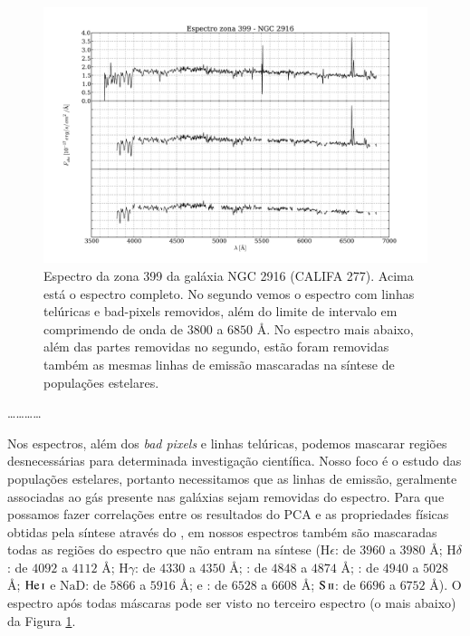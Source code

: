 \begin{figure}
    \includegraphics[width=1.0\textwidth]{figuras/K0277-constant_inital_mask-399.pdf}
    \caption[Exemplo de máscaras em um espectro do cubo de dados.]
    {Espectro da zona 399 da galáxia NGC 2916 (CALIFA 277). Acima está o espectro completo. No segundo vemos o espectro
    com linhas telúricas e bad-pixels removidos, além do limite de intervalo em comprimendo de onda de $3800$ a $6850$
    \AA. No espectro mais abaixo, além das partes removidas no segundo, estão foram removidas também as mesmas linhas de
    emissão mascaradas na síntese de populações estelares.}
    \label{fig:cap4:checkmask}
\end{figure}

\ldots \dots \ldots \ldots

Nos espectros, além dos {\em bad pixels} e linhas telúricas, podemos mascarar regiões desnecessárias para determinada
investigação científica. Nosso foco é o estudo das populações estelares, portanto necessitamos que as linhas de emissão,
geralmente associadas ao gás presente nas galáxias \fixme sejam removidas do espectro. Para que possamos fazer
correlações entre os resultados do PCA e as propriedades físicas obtidas pela síntese através do \starlight, em nossos
espectros também são mascaradas todas as regiões do espectro que não entram na síntese ($\mathrm{H}\epsilon$: de $3960$
a $3980$ \AA; $\mathrm{H}\delta$: de $4092$ a $4112$ \AA; $\mathrm{H}\gamma$: de $4330$ a $4350$ \AA; \Hbeta: de $4848$
a $4874$ \AA; \oIII: de $4940$ a $5028$ \AA; $\mathrm{He\,\textsc{i}}$ e $\mathrm{NaD}$: de $5866$ a $5916$ \AA; \Halpha
e \nII: de $6528$ a $6608$ \AA; $\mathrm{S\,\textsc{ii}}$: de $6696$ a $6752$ \AA). O espectro após todas máscaras pode
ser visto no terceiro espectro (o mais abaixo) da Figura \ref{fig:cap4:checkmask}.


